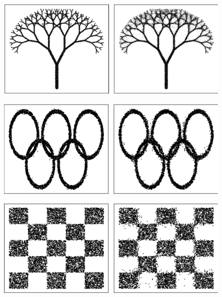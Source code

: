 \documentclass{article}
\theoremstyle{remark}
\theoremstyle{plain}
\begin{document}
{\begin{figure}[!t]
    \begin{minipage}{0.30\textwidth}
        \centering
        \includegraphics[width=\textwidth]{img_tree_true_vs_gen.png}
        \label{img1}
    \end{minipage}
     \begin{minipage}{0.30\textwidth}
        \centering
        \includegraphics[width=\textwidth]{img_5rings_true_vs_gen_new.png}
        \label{img2}
    \end{minipage}
     \begin{minipage}{0.30\textwidth}
        \centering
        \includegraphics[width=\textwidth]{img_checkerboard_true_vs_gen_new.png}

\end{minipage}
\end{figure}}
\end{document}
